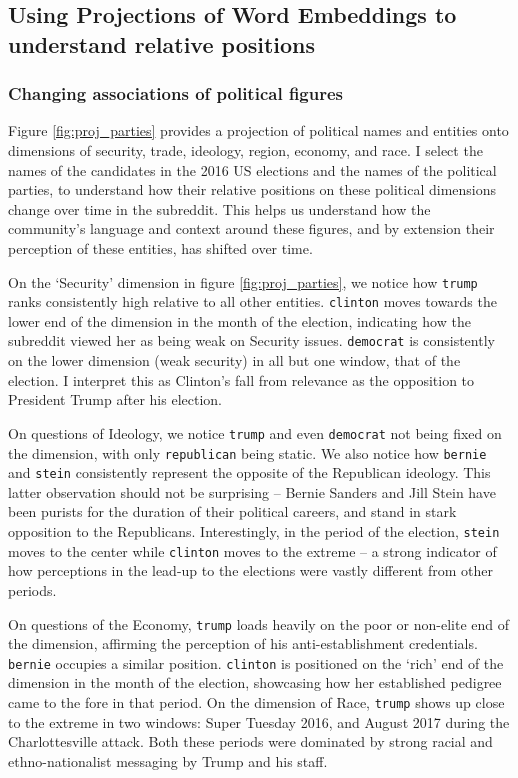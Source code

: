 

\subsection*{Using Projections of Word Embeddings to understand relative positions}

\subsubsection*{Changing associations of political figures}

Figure \ref{fig:proj_parties} provides a projection of political names and entities onto dimensions of security, trade, ideology, region, economy, and race. I select the names of the candidates in the 2016 US elections and the names of the political parties, to understand how their relative positions on these political dimensions change over time in the subreddit. This helps us understand how the community's language and context around these figures, and by extension their perception of these entities, has shifted over time. 

On the `Security' dimension in figure \ref{fig:proj_parties}, we notice how \texttt{trump} ranks consistently high relative to all other entities. \texttt{clinton} moves towards the lower end of the dimension in the month of the election, indicating how the subreddit viewed her as being weak on Security issues. \texttt{democrat} is consistently on the lower dimension (weak security) in all but one window, that of the election. I interpret this as Clinton's fall from relevance as the opposition to President Trump after his election. 

On questions of Ideology, we notice \texttt{trump} and even \texttt{democrat} not being fixed on the dimension, with only \texttt{republican} being static. We also notice how \texttt{bernie} and \texttt{stein} consistently represent the opposite of the Republican ideology. This latter observation should not be surprising -- Bernie Sanders and Jill Stein have been purists for the duration of their political careers, and stand in stark opposition to the Republicans. Interestingly, in the  period of the election, \texttt{stein} moves to the center while \texttt{clinton} moves to the extreme -- a strong indicator of how perceptions in the lead-up to the elections were vastly different from other periods.

On questions of the Economy, \texttt{trump} loads heavily on the poor or non-elite end of the dimension, affirming the perception of his anti-establishment credentials.  \texttt{bernie} occupies a similar position. \texttt{clinton} is positioned on the `rich' end of the dimension in the month of the election, showcasing how her established pedigree came to the fore in that period. On the dimension of Race, \texttt{trump} shows up close to the extreme in two windows: Super Tuesday 2016, and August 2017 during the Charlottesville attack. Both these periods were dominated by strong racial and ethno-nationalist messaging by Trump and his staff.  

